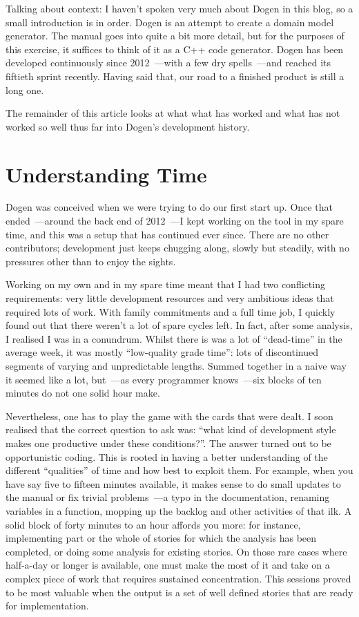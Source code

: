 \documentclass{book}
\begin{document}
Talking about context: I haven't spoken very much about Dogen in this
blog, so a small introduction is in order. Dogen is an attempt to
create a domain model generator. The manual goes into quite a bit more
detail, but for the purposes of this exercise, it suffices to think of
it as a C++ code generator. Dogen has been developed continuously
since 2012~---with a few dry spells~---and reached its fiftieth sprint
recently. Having said that, our road to a finished product is still a
long one.

The remainder of this article looks at what what has worked and what
has not worked so well thus far into Dogen's development history.

\section{Understanding Time}

Dogen was conceived when we were trying to do our first start up. Once
that ended~---around the back end of 2012~---I kept working on the tool
in my spare time, and this was a setup that has continued ever
since. There are no other contributors; development just keeps
chugging along, slowly but steadily, with no pressures other than to
enjoy the sights.

Working on my own and in my spare time meant that I had two
conflicting requirements: very little development resources and very
ambitious ideas that required lots of work. With family commitments
and a full time job, I quickly found out that there weren't a lot of
spare cycles left. In fact, after some analysis, I realised I was in a
conundrum. Whilst there is was a lot of ``dead-time'' in the average
week, it was mostly ``low-quality grade time'': lots of discontinued
segments of varying and unpredictable lengths. Summed together in a
naive way it seemed like a lot, but~---as every programmer
knows~---six blocks of ten minutes do not one solid hour make.

Nevertheless, one has to play the game with the cards that were
dealt. I soon realised that the correct question to ask was: ``what
kind of development style makes one productive under these
conditions?''. The answer turned out to be opportunistic coding. This
is rooted in having a better understanding of the different
``qualities'' of time and how best to exploit them. For example, when
you have say five to fifteen minutes available, it makes sense to do
small updates to the manual or fix trivial problems~---a typo in the
documentation, renaming variables in a function, mopping up the
backlog and other activities of that ilk. A solid block of forty
minutes to an hour affords you more: for instance, implementing part
or the whole of stories for which the analysis has been completed, or
doing some analysis for existing stories. On those rare cases where
half-a-day or longer is available, one must make the most of it and
take on a complex piece of work that requires sustained
concentration. This sessions proved to be most valuable when the
output is a set of well defined stories that are ready for
implementation.
\end{document}
